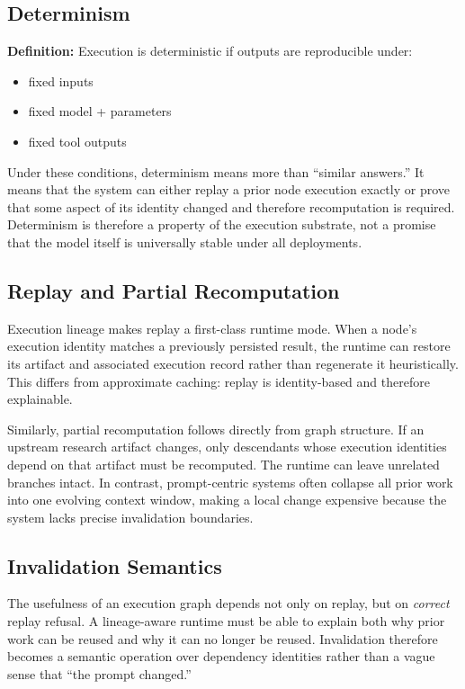 \documentclass{article}
\begin{document}
\subsection{Determinism}

\textbf{Definition:}
Execution is deterministic if outputs are reproducible under:
\begin{itemize}
\item fixed inputs
\item fixed model + parameters
\item fixed tool outputs
\end{itemize}

Under these conditions, determinism means more than ``similar answers.'' It means that the system can either replay a prior node execution exactly or prove that some aspect of its identity changed and therefore recomputation is required. Determinism is therefore a property of the execution substrate, not a promise that the model itself is universally stable under all deployments.

\subsection{Replay and Partial Recomputation}

Execution lineage makes replay a first-class runtime mode. When a node's execution identity matches a previously persisted result, the runtime can restore its artifact and associated execution record rather than regenerate it heuristically. This differs from approximate caching: replay is identity-based and therefore explainable.

Similarly, partial recomputation follows directly from graph structure. If an upstream research artifact changes, only descendants whose execution identities depend on that artifact must be recomputed. The runtime can leave unrelated branches intact. In contrast, prompt-centric systems often collapse all prior work into one evolving context window, making a local change expensive because the system lacks precise invalidation boundaries.

\subsection{Invalidation Semantics}

The usefulness of an execution graph depends not only on replay, but on \emph{correct} replay refusal. A lineage-aware runtime must be able to explain both why prior work can be reused and why it can no longer be reused. Invalidation therefore becomes a semantic operation over dependency identities rather than a vague sense that ``the prompt changed.''
\end{document}

